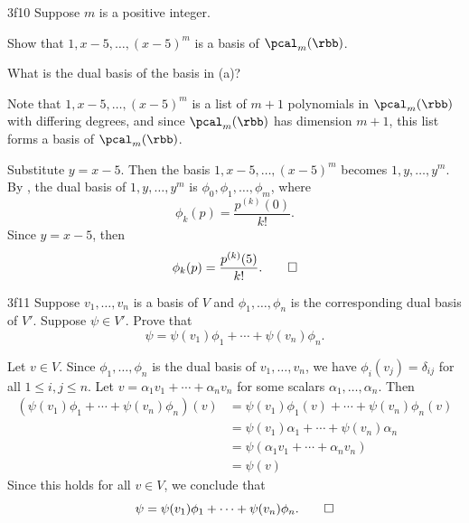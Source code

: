 \begin{exercise}{3f10}
    Suppose $m$ is a positive integer.
    \begin{subexercises}
        \item Show that $1, x - 5, \ldots, (x - 5)^m$ is a basis of $\pcal_m(\rbb)$.
        \item What is the dual basis of the basis in (a)?
    \end{subexercises}
\end{exercise}

\begin{solenum}
    \item Note that $1, x - 5, \ldots, (x - 5)^m$ is a list of $m + 1$ polynomials in $\pcal_m(\rbb)$ with differing degrees, and since $\pcal_m(\rbb)$ has dimension $m + 1$, this list forms a basis of $\pcal_m(\rbb)$.
    \item Substitute $y = x - 5$.
	Then the basis $1, x - 5, \ldots, (x - 5)^m$ becomes $1, y, \ldots, y^m$.
	By , the dual basis of $1, y, \ldots, y^m$ is $\phi_0, \phi_1, \ldots, \phi_m$, where
    \[
    	\phi_k(p) = \frac{p^{(k)}(0)}{k!}.
    \]
    Since $y = x - 5$, then
    \[
    	\phi_k(p) = \frac{p^{(k)}(5)}{k!}. \qedhere
    \]
\end{solenum}

\begin{exercise}{3f11}
    Suppose $v_1, \ldots, v_n$ is a basis of $V$ and $\phi_1, \ldots, \phi_n$ is the corresponding dual basis of $V'$.
	Suppose $\psi \in V'$.
	Prove that
    \[
    	\psi = \psi(v_1) \phi_1 + \cdots + \psi(v_n) \phi_n.
    \]
\end{exercise}

\begin{sol}
    Let $v \in V$.
	Since $\phi_1, \ldots, \phi_n$ is the dual basis of $v_1, \ldots, v_n$, we have $\phi_i(v_j) = \delta_{ij}$ for all $1 \leq i, j \leq n$.
	Let $v = \alpha_1 v_1 + \cdots + \alpha_n v_n$ for some scalars $\alpha_1, \ldots, \alpha_n$.
	Then
    \begin{align*}
        (\psi(v_1) \phi_1 + \cdots + \psi(v_n) \phi_n)(v) &= \psi(v_1) \phi_1(v) + \cdots + \psi(v_n) \phi_n(v) \\
        &= \psi(v_1) \alpha_1 + \cdots + \psi(v_n) \alpha_n \\
        &= \psi(\alpha_1 v_1 + \cdots + \alpha_n v_n) \\
        &= \psi(v)
    \end{align*}
    Since this holds for all $v \in V$, we conclude that
    \[
    	\psi = \psi(v_1) \phi_1 + \cdots + \psi(v_n) \phi_n. \qedhere
    \]
\end{sol}

